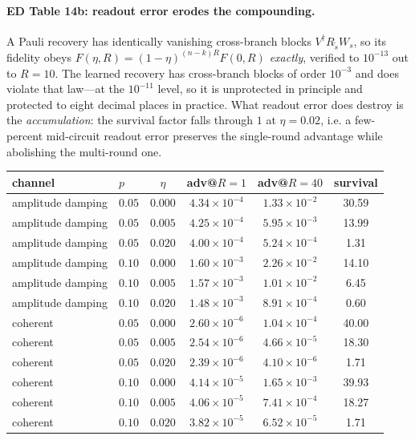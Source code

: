 \documentclass[10pt,a4paper]{article}
\begin{document}
\paragraph*{ED Table 14b: readout error erodes the compounding.}
A Pauli recovery has identically vanishing cross-branch blocks
$V^\dagger R_{\tilde s}W_s$, so its fidelity obeys
$F(\eta,R)=(1-\eta)^{(n-k)R}F(0,R)$ \emph{exactly}, verified to $10^{-13}$ out to
$R=10$.  The learned recovery has cross-branch blocks of order $10^{-3}$ and does
violate that law---at the $10^{-11}$ level, so it is unprotected in principle and
protected to eight decimal places in practice.  What readout error does destroy is
the \emph{accumulation}: the survival factor falls through $1$ at $\eta=0.02$, i.e.
a few-percent mid-circuit readout error preserves the single-round advantage while
abolishing the multi-round one.
\begin{longtable}{llcccc}
\toprule channel & $p$ & $\eta$ & adv@$R{=}1$ & adv@$R{=}40$ & survival \\ \midrule
amplitude damping & $0.05$ & $0.000$ & $4.34\times 10^{-4}$ & $1.33\times 10^{-2}$ & 30.59 \\
amplitude damping & $0.05$ & $0.005$ & $4.25\times 10^{-4}$ & $5.95\times 10^{-3}$ & 13.99 \\
amplitude damping & $0.05$ & $0.020$ & $4.00\times 10^{-4}$ & $5.24\times 10^{-4}$ & 1.31 \\
amplitude damping & $0.10$ & $0.000$ & $1.60\times 10^{-3}$ & $2.26\times 10^{-2}$ & 14.10 \\
amplitude damping & $0.10$ & $0.005$ & $1.57\times 10^{-3}$ & $1.01\times 10^{-2}$ & 6.45 \\
amplitude damping & $0.10$ & $0.020$ & $1.48\times 10^{-3}$ & $8.91\times 10^{-4}$ & 0.60 \\
coherent & $0.05$ & $0.000$ & $2.60\times 10^{-6}$ & $1.04\times 10^{-4}$ & 40.00 \\
coherent & $0.05$ & $0.005$ & $2.54\times 10^{-6}$ & $4.66\times 10^{-5}$ & 18.30 \\
coherent & $0.05$ & $0.020$ & $2.39\times 10^{-6}$ & $4.10\times 10^{-6}$ & 1.71 \\
coherent & $0.10$ & $0.000$ & $4.14\times 10^{-5}$ & $1.65\times 10^{-3}$ & 39.93 \\
coherent & $0.10$ & $0.005$ & $4.06\times 10^{-5}$ & $7.41\times 10^{-4}$ & 18.27 \\
coherent & $0.10$ & $0.020$ & $3.82\times 10^{-5}$ & $6.52\times 10^{-5}$ & 1.71 \\
\bottomrule\end{longtable}
\end{document}
